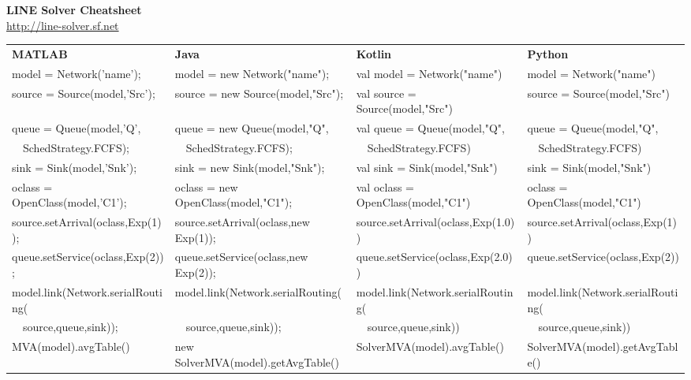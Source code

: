 \documentclass[9pt,landscape,a4paper]{extarticle}
\begin{document}
\begin{center}
{\Large\bfseries\color{headerblue} LINE Solver Cheatsheet}\\[-0.2em]
{\small\url{http://line-solver.sf.net}}
\end{center}

\vspace{-0.2em}

\newlength{\colwidth}
\setlength{\colwidth}{0.2425\textwidth}
\begin{tcolorbox}[colback=codebg, colframe=codeframe, boxrule=0.3pt, arc=1pt,
  left=2pt, right=2pt, top=1pt, bottom=1pt, title={\small\textbf{Model Structure}},
  coltitle=black, colbacktitle=codebg]
\ttfamily\tiny\setlength{\tabcolsep}{0pt}
\begin{tabular*}{\textwidth}{@{\extracolsep{\fill}}p{\colwidth}p{\colwidth}@{\hspace{5mm}}p{\colwidth}@{\hspace{5mm}}p{\colwidth}@{}}
\textbf{\textsf{\scriptsize MATLAB}} & \textbf{\textsf{\scriptsize Java}} & \textbf{\textsf{\scriptsize Kotlin}} & \textbf{\textsf{\scriptsize Python}} \\[1pt]
model = Network('name'); &
model = new Network("name"); &
val model = Network("name") &
model = Network("name") \\
source = Source(model,'Src'); &
source = new Source(model,"Src"); &
val source = Source(model,"Src") &
source = Source(model,"Src") \\
queue = Queue(model,'Q', &
queue = new Queue(model,"Q", &
val queue = Queue(model,"Q", &
queue = Queue(model,"Q", \\
\ \ SchedStrategy.FCFS); &
\ \ SchedStrategy.FCFS); &
\ \ SchedStrategy.FCFS) &
\ \ SchedStrategy.FCFS) \\
sink = Sink(model,'Snk'); &
sink = new Sink(model,"Snk"); &
val sink = Sink(model,"Snk") &
sink = Sink(model,"Snk") \\
oclass = OpenClass(model,'C1'); &
oclass = new OpenClass(model,"C1"); &
val oclass = OpenClass(model,"C1") &
oclass = OpenClass(model,"C1") \\
source.setArrival(oclass,Exp(1)); &
source.setArrival(oclass,new Exp(1)); &
source.setArrival(oclass,Exp(1.0)) &
source.setArrival(oclass,Exp(1)) \\
queue.setService(oclass,Exp(2)); &
queue.setService(oclass,new Exp(2)); &
queue.setService(oclass,Exp(2.0)) &
queue.setService(oclass,Exp(2)) \\
model.link(Network.serialRouting( &
model.link(Network.serialRouting( &
model.link(Network.serialRouting( &
model.link(Network.serialRouting( \\
\ \ source,queue,sink)); &
\ \ source,queue,sink)); &
\ \ source,queue,sink)) &
\ \ source,queue,sink)) \\
MVA(model).avgTable() &
new SolverMVA(model).getAvgTable() &
SolverMVA(model).avgTable() &
SolverMVA(model).getAvgTable() \\
\end{tabular*}
\end{tcolorbox}
\end{document}
